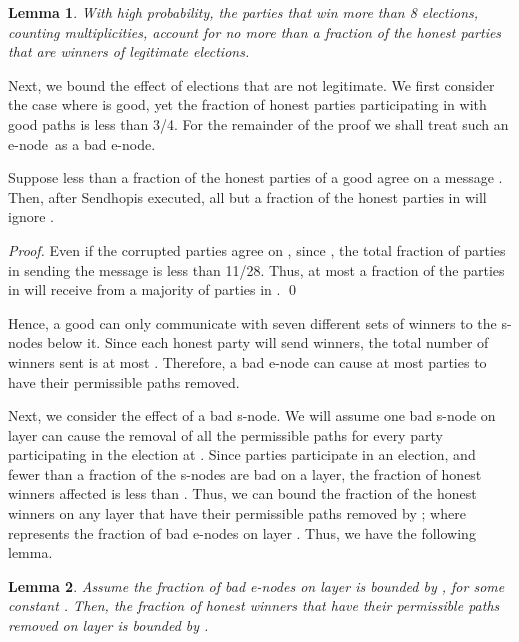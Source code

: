 \documentclass[11pt,letter]{article}
\theoremstyle{mytheoremstyle}
\newtheorem{lemma}{Lemma}
\newcommand{\Sendhop}{\textsf{Sendhop}}
\newcounter{claimcounter}
\newenvironment{claim}{\stepcounter{claimcounter}{\vspace{0.5em}\noindent \textit{Claim \theclaimcounter.~}}}{}
\begin{document}
\begin{description}
{\begin{lemma}
	With high probability, the parties that win more than 8 elections, counting multiplicities, account for no more than a  fraction of the honest parties that are winners of legitimate elections.
\end{lemma}

Next, we bound the effect of elections that are not legitimate. We first consider the case where  is good, yet the fraction of honest parties participating in  with good paths is less than 3/4. For the remainder of the proof we shall treat such an \textsf{e-node}\   as a bad \textsf{e-node}.

\begin{claim}
	\label{c:bad election}
	Suppose less than a  fraction of the honest parties of a good  agree on a message . Then, after
	\Sendhop is executed, all but a  fraction of the honest parties in  will ignore .
\end{claim}

\noindent\begin{proof}
	Even if the corrupted parties agree on , since , the total fraction of parties in  sending the message  is less than 11/28. Thus, at most a  fraction of the parties in  will receive  from a majority of parties in .
	\qed
\end{proof}

Hence, a good  can only communicate with seven different sets of winners to the \textsf{s-node}s below it. Since each honest party will send  winners, the total number of winners sent is at most . Therefore, a bad \textsf{e-node} can cause at most  parties to have their permissible paths removed.

Next, we consider the effect of a bad \textsf{s-node}. We will assume one bad \textsf{s-node}  on layer  can cause the removal of all the permissible paths for every party participating in the election at . Since  parties participate in an election, and fewer than a  fraction of the \textsf{s-node}s are bad on a layer, the fraction of honest winners affected is less than . Thus, we can bound the fraction of the honest winners on any layer  that have their permissible paths removed by ; where  represents the fraction of bad \textsf{e-node}s on layer .
Thus, we have the following lemma.

\begin{lemma}
	\label{l:win too often} Assume the fraction of bad \textsf{e-node}s on layer  is bounded by , for some constant . Then, the fraction of honest winners that have their permissible paths removed on layer  is bounded by .
\end{lemma}

}
\end{description}
\end{document}
